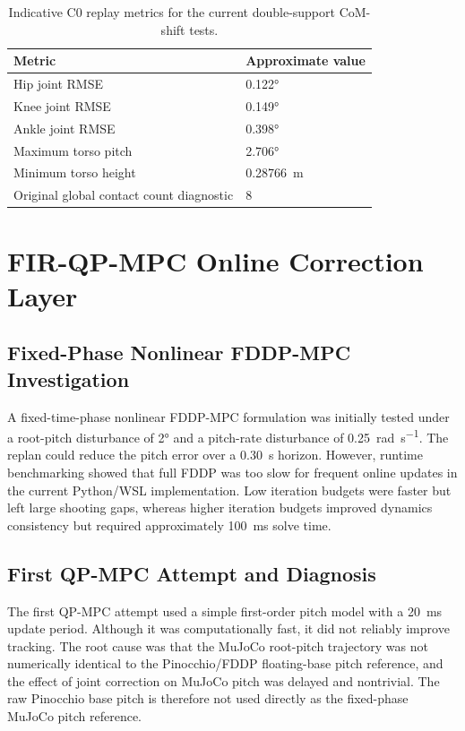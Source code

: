 \documentclass[12pt,a4paper]{report}
\begin{document}
\begin{table}[htbp]
\centering
\caption{Indicative C0 replay metrics for the current double-support CoM-shift tests.}
\label{tab:c0_metrics}
\begin{tabular}{@{}ll@{}}
\toprule
Metric & Approximate value \\
\midrule
Hip joint RMSE & \ang{0.122} \\
Knee joint RMSE & \ang{0.149} \\
Ankle joint RMSE & \ang{0.398} \\
Maximum torso pitch & \ang{2.706} \\
Minimum torso height & \SI{0.28766}{\metre} \\
Original global contact count diagnostic & 8 \\
\bottomrule
\end{tabular}
\end{table}
 
\section{FIR-QP-MPC Online Correction Layer}\label{sec:online_correction}
 
\subsection{Fixed-Phase Nonlinear FDDP-MPC Investigation}
A fixed-time-phase nonlinear FDDP-MPC formulation was initially tested under a root-pitch disturbance of \ang{2} and a pitch-rate disturbance of \SI{0.25}{\radian\per\second}. The replan could reduce the pitch error over a \SI{0.30}{\second} horizon. However, runtime benchmarking showed that full FDDP was too slow for frequent online updates in the current Python/WSL implementation. Low iteration budgets were faster but left large shooting gaps, whereas higher iteration budgets improved dynamics consistency but required approximately \SI{100}{\milli\second} solve time.
 
\subsection{First QP-MPC Attempt and Diagnosis}
The first QP-MPC attempt used a simple first-order pitch model with a \SI{20}{\milli\second} update period. Although it was computationally fast, it did not reliably improve tracking. The root cause was that the MuJoCo root-pitch trajectory was not numerically identical to the Pinocchio/FDDP floating-base pitch reference, and the effect of joint correction on MuJoCo pitch was delayed and nontrivial. The raw Pinocchio base pitch is therefore not used directly as the fixed-phase MuJoCo pitch reference.
 
\end{document}
